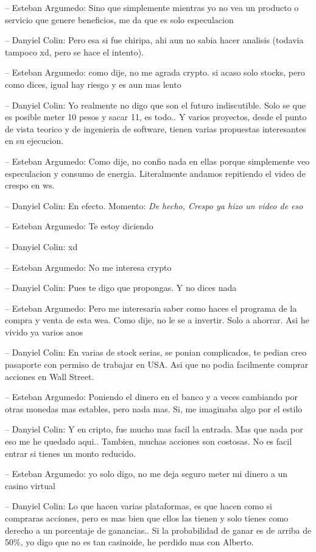 -- Esteban Argumedo: Sino que simplemente mientras yo no vea un producto
o servicio que genere beneficios, me da que es solo especulacion

-- Danyiel Colin: Pero esa si fue chiripa, ahi aun no sabia hacer
analisis (todavia tampoco xd, pero se hace el intento).

-- Esteban Argumedo: como dije, no me agrada crypto. si acaso solo
stocks, pero como dices, igual hay riesgo y es aun mas lento

-- Danyiel Colin: Yo realmente no digo que son el futuro indiscutible.
Solo se que es posible meter 10 pesos y sacar 11, es todo.. Y varios
proyectos, desde el punto de vista teorico y de ingenieria de software,
tienen varias propuestas interesantes en su ejecucion.

-- Esteban Argumedo: Como dije, no confio nada en ellas porque
simplemente veo especulacion y consumo de energia. Literalmente andamos
repitiendo el video de crespo en ws.

-- Danyiel Colin: En efecto. Momento: \emph{De hecho, Crespo ya hizo un
video de eso}

-- Esteban Argumedo: Te estoy diciendo

-- Danyiel Colin: xd

-- Esteban Argumedo: No me interesa crypto

-- Danyiel Colin: Pues te digo que propongas. Y no dices nada

-- Esteban Argumedo: Pero me interesaria saber como haces el programa de
la compra y venta de esta wea. Como dije, no le se a invertir. Solo a
ahorrar. Asi he vivido ya varios anos

-- Danyiel Colin: En varias de stock serias, se ponian complicados, te
pedian creo pasaporte con permiso de trabajar en USA. Asi que no podia
facilmente comprar acciones en Wall Street.

-- Esteban Argumedo: Poniendo el dinero en el banco y a veces cambiando
por otras monedas mas estables, pero nada mas. Si, me imaginaba algo por
el estilo

-- Danyiel Colin: Y en cripto, fue mucho mas facil la entrada. Mas que
nada por eso me he quedado aqui.. Tambien, muchas acciones son costosas.
No es facil entrar si tienes un monto reducido.

-- Esteban Argumedo: yo solo digo, no me deja seguro meter mi dinero a
un casino virtual

-- Danyiel Colin: Lo que hacen varias plataformas, es que hacen como si
compraras acciones, pero es mas bien que ellos las tienen y solo tienes
como derecho a un porcentaje de ganancias.. Si la probabilidad de ganar
es de arriba de 50\%, yo digo que no es tan casinoide, he perdido mas
con Alberto.

